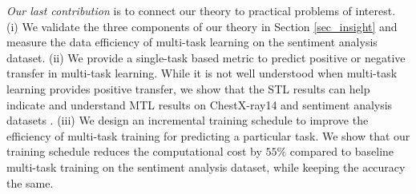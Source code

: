 \textit{Our last contribution} is to connect our theory to practical problems of interest.
(i) We validate the three components of our theory in Section \ref{sec_insight} and measure the data efficiency of multi-task learning on the sentiment analysis dataset.
(ii) We provide a single-task based metric to predict positive or negative transfer in multi-task learning.
While it is not well understood when multi-task learning provides positive transfer, we show that the STL results can help indicate and understand MTL results on ChestX-ray14 \cite{chexnet17} and sentiment analysis datasets \cite{LZWDA18}.
(iii) We design an incremental training schedule to improve the efficiency of multi-task training for predicting a particular task.
We show that our training schedule reduces the computational cost by $55\%$ compared to baseline multi-task training on the sentiment analysis dataset, while keeping the accuracy the same.

